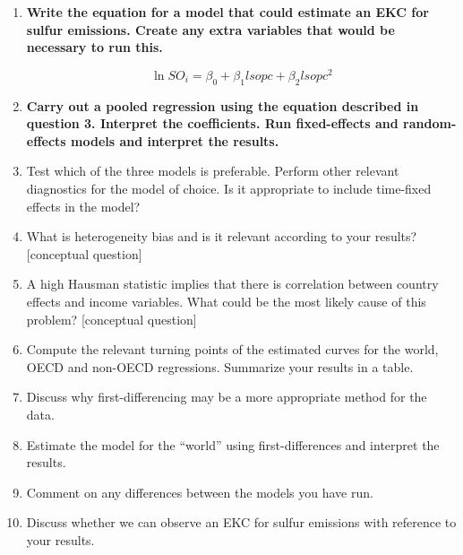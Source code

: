 \documentclass{scrartcl}
\begin{document}
\begin{enumerate}
	\item \textbf{Write the equation for a model that could estimate an EKC for sulfur emissions. Create any extra variables that would be necessary to run this.}
	
	\[ \ln{SO_i} = \beta_0 + \beta_1 lsopc + \beta_2 lsopc^2\]
	
	
	\item \textbf{Carry out a pooled regression using the equation described in question 3. Interpret the coefficients. Run fixed-effects and random-effects models and interpret the results.}
	
		
	
	\item Test which of the three models is preferable. Perform other relevant diagnostics for the model of choice. Is it appropriate to include time-fixed effects in the model?
	
	
	
	\item What is heterogeneity bias and is it relevant according to your results? [conceptual question]
	
	\item A high Hausman statistic implies that there is correlation between country effects and income variables. What could be the most likely cause of this problem? [conceptual question]
		
	\item Compute the relevant turning points of the estimated curves for the world, OECD and non-OECD regressions. Summarize your results in a table.
	
	
		
	\item Discuss why first-differencing may be a more appropriate method for the data.
	
	\item Estimate the model for the ``world'' using first-differences and interpret the results.
	
	
	
	\item Comment on any differences between the models you have run.
	
	\item Discuss whether we can observe an EKC for sulfur emissions with reference to your results.
	
	\end{enumerate}
	
\end{document}
